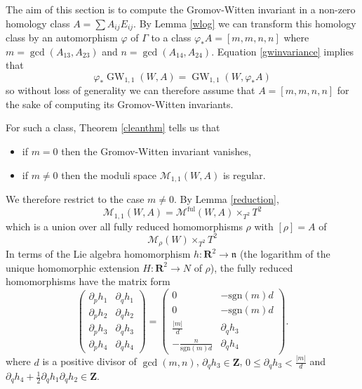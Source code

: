 \documentclass[11pt]{amsart}
\newcommand{\mM}{\mathcal{M}}
\newcommand{\RR}{\mathbf{R}}
\newcommand{\ZZ}{\mathbf{Z}}
\newcommand{\GW}{\operatorname{GW}}
\newcommand{\WW}{W}
\newcommand{\nn}{\mathfrak{n}}
\newcommand{\sgn}{\mathrm{sgn}}
\renewcommand{\phi}{\varphi}
\numberwithin{equation}{section}
\theoremstyle{definition}
\theoremstyle{remark}
\begin{document}
The aim of this section is to compute the Gromov-Witten invariant in a non-zero homology class $A=\sum A_{ij}E_{ij}$. By Lemma \ref{wlog} we can transform this homology class by an automorphism $\phi$ of $\Gamma$ to a class $\phi_*A=[m,m,n,n]$ where $m=\gcd(A_{13},A_{23})$ and $n=\gcd(A_{14},A_{24})$. Equation \eqref{gwinvariance} implies that
\[\phi_*\GW_{1,1}(\WW,A)=\GW_{1,1}(\WW,\phi_*A)\]
so without loss of generality we can therefore assume that $A=[m,m,n,n]$ for the sake of computing its Gromov-Witten invariants.

For such a class, Theorem \ref{cleanthm} tells us that
\begin{itemize}
\item if $m=0$ then the Gromov-Witten invariant vanishes,
\item if $m\neq 0$ then the moduli space $\mM_{1,1}(\WW,A)$ is regular.
\end{itemize}
We therefore restrict to the case $m\neq 0$. By Lemma \ref{reduction},
\[\mM_{1,1}(\WW,A)=\mM^{\mathrm{ful}}(\WW,A)\times_{T^2}T^2\]
which is a union over all fully reduced homomorphisms $\rho$ with $[\rho]=A$ of
\[\mM_{\rho}(\WW)\times_{T^2}T^2\]
In terms of the Lie algebra homomorphism $h\colon\RR^2\to\nn$ (the logarithm of the unique homomorphic extension $H\colon\RR^2\to N$ of $\rho$), the fully reduced homomorphisms have the matrix form
\[\left(\begin{array}{cc}
\partial_ph_1 & \partial_qh_1\\
\partial_ph_2 & \partial_qh_2\\
\partial_ph_3 & \partial_qh_3\\
\partial_ph_4 & \partial_qh_4
\end{array}\right)=\left(\begin{array}{cc}
0 & -\sgn(m)d\\
0 & -\sgn(m)d\\
\frac{|m|}{d} & \partial_qh_3\\
-\frac{n}{\sgn(m)d} & \partial_qh_4
\end{array}\right).\]
where $d$ is a positive divisor of $\gcd(m,n)$, $\partial_qh_3\in\ZZ$, $0\leq \partial_qh_3<\frac{|m|}{d}$ and $\partial_qh_4+\frac{1}{2}\partial_qh_1\partial_qh_2\in\ZZ$.
\end{document}
